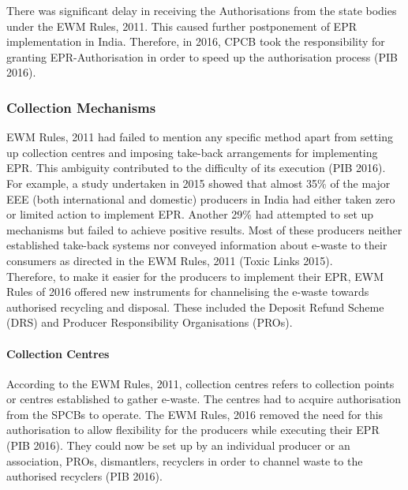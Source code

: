 \documentclass[a4paper, 12pt]{article}
\begin{document}
                    There was significant delay in receiving the Authorisations from the state bodies under the EWM Rules, 2011. This caused further postponement of EPR implementation in India. Therefore, in 2016, CPCB took the responsibility for granting EPR-Authorisation in order to speed up the authorisation process (PIB 2016). \\
                    
                    \subsubsection{Collection Mechanisms}
                    
                    EWM Rules, 2011 had failed to mention any specific method apart from setting up collection centres and imposing take-back arrangements for implementing EPR. This ambiguity contributed to the difficulty of its execution (PIB 2016). For example, a study undertaken in 2015 showed that almost 35\% of the major EEE (both international and domestic) producers in India had either taken zero or limited action to implement EPR. Another 29\% had attempted to set up mechanisms but failed to achieve positive results. Most of these producers neither established take-back systems nor conveyed information about e-waste to their consumers as directed in the EWM Rules, 2011 (Toxic Links 2015).\\
                    
                    Therefore, to make it easier for the producers to implement their EPR, EWM Rules of 2016 offered new instruments for channelising the e-waste towards authorised recycling and disposal. These included the Deposit Refund Scheme (DRS) and Producer Responsibility Organisations (PROs). \\
                    
                    \paragraph{Collection Centres}
                    
                    According to the EWM Rules, 2011, collection centres refers to collection points or centres established to gather e-waste. The centres had to acquire authorisation from the SPCBs to operate. The EWM Rules, 2016 removed the need for this authorisation to allow flexibility for the producers while executing their EPR (PIB 2016). They could now be set up by an individual producer or an association, PROs, dismantlers, recyclers in order to channel waste to the authorised recyclers (PIB 2016).\\
                    
\end{document}
